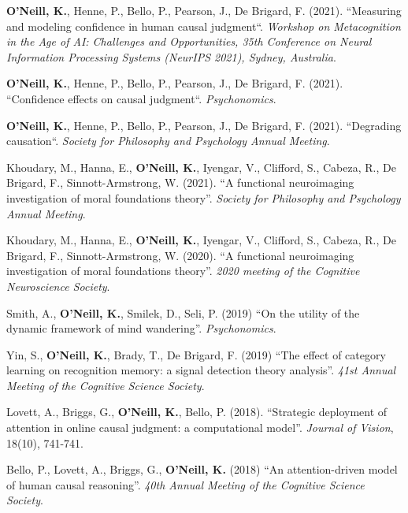\textbf{O'Neill, K.}, Henne, P., Bello, P., Pearson, J., De Brigard,
F. (2021). ``Measuring and modeling confidence in human causal
judgment``. \emph{Workshop on Metacognition in the Age of AI:
Challenges and Opportunities, 35th Conference on Neural Information
Processing Systems (NeurIPS 2021), Sydney, Australia}.

\textbf{O'Neill, K.}, Henne, P., Bello, P., Pearson, J., De Brigard,
F. (2021). ``Confidence effects on causal
judgment``. \emph{Psychonomics}.

\textbf{O'Neill, K.}, Henne, P., Bello, P., Pearson, J., De Brigard,
F. (2021). ``Degrading causation``. \emph{Society for Philosophy and
Psychology Annual Meeting}.

Khoudary, M., Hanna, E., \textbf{O’Neill, K.}, Iyengar, V., Clifford,
S., Cabeza, R., De Brigard, F., Sinnott-Armstrong, W. (2021). ``A
functional neuroimaging investigation of moral foundations
theory''. \emph{Society for Philosophy and Psychology Annual Meeting}.

Khoudary, M., Hanna, E., \textbf{O’Neill, K.}, Iyengar, V., Clifford,
S., Cabeza, R., De Brigard, F., Sinnott-Armstrong, W. (2020). ``A
functional neuroimaging investigation of moral foundations
theory''. \emph{2020 meeting of the Cognitive Neuroscience Society}.

Smith, A., \textbf{O'Neill, K.}, Smilek, D., Seli, P. (2019) ``On the
utility of the dynamic framework of mind
wandering''. \emph{Psychonomics}.

Yin, S., \textbf{O'Neill, K.}, Brady, T., De Brigard, F. (2019) ``The
effect of category learning on recognition memory: a signal detection
theory analysis''. \emph{41st Annual Meeting of the Cognitive Science
Society}.

Lovett, A., Briggs, G., \textbf{O'Neill, K.}, Bello,
P. (2018). ``Strategic deployment of attention in online causal
judgment: a computational model''. \emph{Journal of Vision}, 18(10),
741-741.

Bello, P., Lovett, A., Briggs, G., \textbf{O'Neill, K.} (2018) ``An
attention-driven model of human causal reasoning''. \emph{40th Annual
Meeting of the Cognitive Science Society}.
